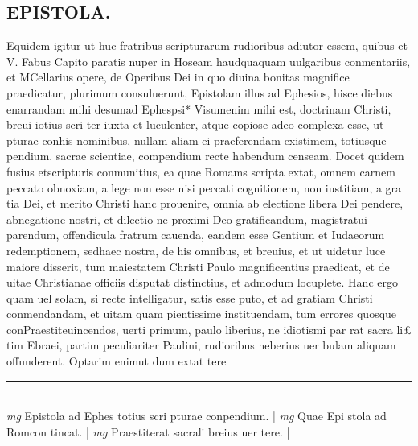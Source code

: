 \documentclass{article}
\begin{document}
\begin{pages}
\section*{EPISTOLA. }\pstart Equidem igitur ut huc fratribus scripturarum rudioribus   adiutor essem, quibus et V. Fabus  Capito paratis nuper in Hoseam haudquaquam uulgaribus conmentariis, et MCellarius opere, de Operibus Dei in quo diuina bonitas magnifice praedicatur, plurimum consuluerunt, Epistolam illus ad Ephesios, hisce diebus enarrandam mihi desumad Ephespsi* Visumenim mihi est, doctrinam Christi, breui-iotius scri ter iuxta et luculenter, atque copiose adeo complexa esse, ut pturae conhis nominibus, nullam aliam ei praeferendam existimem, totiusque pendium. sacrae scientiae, compendium recte habendum censeam.  \pend\pstart Docet quidem fusius etscripturis conmunitius, ea quae Romams scripta extat, omnem carnem peccato obnoxiam, a lege non esse nisi peccati cognitionem, non iustitiam, a gra tia Dei, et merito Christi hanc prouenire, omnia ab electione libera Dei pendere, abnegatione nostri, et dilcctio ne proximi Deo gratificandum, magistratui parendum, offendicula fratrum cauenda, eandem esse Gentium et Iudaeorum redemptionem, sedhaec nostra, de his omnibus, et breuius, et ut uidetur luce maiore disserit, tum maiestatem Christi Paulo magnificentius praedicat, et de uitae Christianae officiis disputat distinctius, et admodum locuplete.  \pend\pstart Hanc ergo quam uel solam, si recte intelligatur, satis esse puto, et ad gratiam Christi conmendandam, et uitam quam pientissime instituendam, tum errores quosque conPraestiteuincendos, uerti primum, paulo liberius, ne idiotismi par rat sacra li£ tim Ebraei, partim peculiariter Paulini, rudioribus neberius uer bulam aliquam offunderent. Optarim enimut dum extat tere\pend
\vspace{0.5cm}\noindent
\vspace{0.2cm}\rule{1cm}{0.2pt}\\ 
\hspace{0.2cm}\textit{mg}
\footnotesize Epistola ad Ephes totius scri pturae conpendium.  
\normalsize| 
\hspace{0.2cm}\textit{mg}
\footnotesize Quae Epi stola ad Romcon tincat. 
\normalsize| 
\hspace{0.2cm}\textit{mg}
\footnotesize Praestiterat sacrali breius uer tere.  
\normalsize| 

\end{pages}
\end{document}
